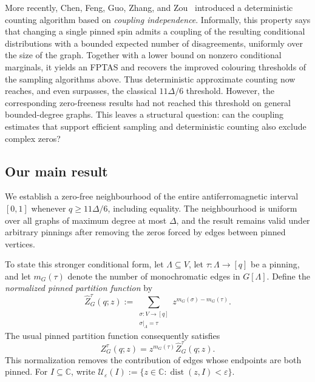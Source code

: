 \documentclass[11pt,reqno]{article}
\theoremstyle{plain}
\theoremstyle{definition}
\theoremstyle{remark}
\theoremstyle{definition}
\theoremstyle{remark}
\newcommand{\C}{\mathbb{C}}
\newcommand{\eps}{\varepsilon}
\newcommand{\dist}{\operatorname{dist}}
\newcommand{\Deg}{\Delta}                        %
\newcommand{\colours}{[q]}                        %
\newcommand{\Zpin}[2]{Z_{#1}^{#2}}
\newcommand{\nZpin}[2]{\widehat Z_{#1}^{#2}}
\begin{document}
More recently, Chen, Feng, Guo, Zhang, and Zou~\cite{CFFGZZ2024}
introduced a deterministic counting algorithm based on \emph{coupling
independence}.  Informally, this property says that changing a single
pinned spin admits a coupling of the resulting conditional distributions
with a bounded expected number of disagreements, uniformly over the
size of the graph.  Together with a lower bound on nonzero conditional
marginals, it yields an FPTAS and recovers the improved colouring
thresholds of the sampling algorithms above.  Thus deterministic
approximate counting now reaches, and even surpasses, the classical
\(11\Deg/6\) threshold.  However, the corresponding zero-freeness
results had not reached this threshold on general bounded-degree
graphs.  This leaves a structural question: can the coupling estimates
that support efficient sampling and deterministic counting also exclude
complex zeros?

\subsection{Our main result}

We establish a zero-free neighbourhood of the entire antiferromagnetic
interval \([0,1]\) whenever \(q\ge11\Deg/6\), including equality.
The neighbourhood is uniform over all graphs of maximum degree at most
\(\Deg\), and the result remains valid under arbitrary pinnings after
removing the zeros forced by edges between pinned vertices.

To state this stronger conditional form, let \(\Lambda\subseteq V\),
let \(\tau\colon\Lambda\to\colours\) be a pinning, and let
\(m_G(\tau)\) denote the number of monochromatic edges in \(G[\Lambda]\).
Define the \emph{normalized pinned partition function} by
\begin{equation}
  \nZpin{G}{\tau}(q;z)
  :=\sum_{\substack{\sigma\colon V\to\colours\\
                    \sigma|_\Lambda=\tau}}
       z^{m_G(\sigma)-m_G(\tau)}.
  \label{eq:intro-normalized-pinned}
\end{equation}
The usual pinned partition function consequently satisfies
\begin{equation}
  \Zpin{G}{\tau}(q;z)
  =z^{m_G(\tau)}\nZpin{G}{\tau}(q;z).
  \label{eq:intro-normalization}
\end{equation}
This normalization removes the contribution of edges whose endpoints
are both pinned.  For \(I\subseteq\C\), write
\(\mathcal U_\eps(I):=\{z\in\C:\dist(z,I)<\eps\}\).
\end{document}
